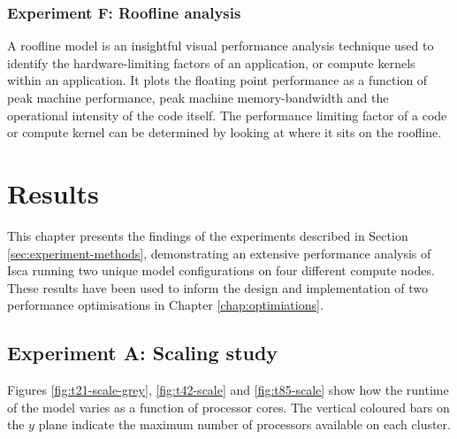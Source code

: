 \documentclass[a4paper,11pt]{report}
\begin{document}
\subsection{Experiment F: Roofline analysis}
A roofline model is an insightful visual performance analysis technique used to identify the hardware-limiting factors of an application, or compute kernels within an application. It plots the floating point performance as a function of peak machine performance, peak machine memory-bandwidth and the operational intensity of the code itself. The performance limiting factor of a code or compute kernel can be determined by looking at where it sits on the roofline.


\chapter{Results}
\label{chap:results}
This chapter presents the findings of the experiments described in Section \ref{sec:experiment-methods}, demonstrating an extensive performance analysis of Isca running two unique model configurations on four different compute nodes. These results have been used to inform the design and implementation of two performance optimisations in Chapter \ref{chap:optimiations}. 
\section{Experiment A: Scaling study}
Figures \ref{fig:t21-scale-grey}, \ref{fig:t42-scale} and \ref{fig:t85-scale} show how the runtime of the model varies as a function of processor cores. The vertical coloured bars on the $y$ plane indicate the maximum number of processors available on each cluster.
\end{document}
